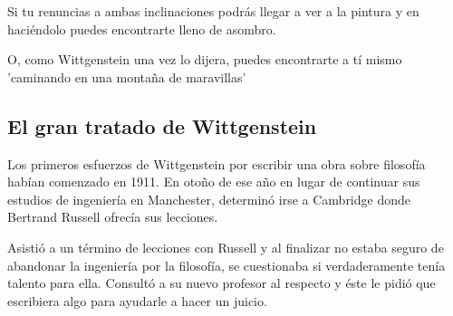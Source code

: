 Si tu renuncias a ambas inclinaciones podrás llegar a ver a la pintura y en
haciéndolo puedes encontrarte lleno de asombro.

O, como Wittgenstein una vez lo dijera, puedes encontrarte a tí mismo 'caminando
en una montaña de maravillas'




\subsection{El gran tratado de Wittgenstein}


Los primeros esfuerzos de Wittgenstein por escribir una obra sobre filosofía
habían comenzado en 1911. En otoño de ese año en lugar de continuar sus estudios
de ingeniería en Manchester, determinó irse a Cambridge donde Bertrand Russell
ofrecía sus lecciones.

Asistió a un término de lecciones con Russell y al finalizar no estaba seguro de
abandonar la ingeniería por la filosofía, se cuestionaba si verdaderamente tenía
talento para ella. Consultó a su nuevo profesor al respecto y éste le pidió que
escribiera algo para ayudarle a hacer un juicio.

